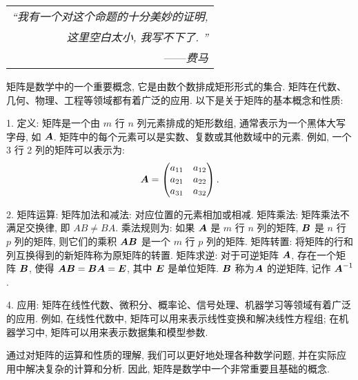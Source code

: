 \begin{flushright}
    \begin{tabular}{r||}
        \textit{“我有一个对这个命题的十分美妙的证明, }\\
        \textit{这里空白太小, 我写不下了. ”}\\
        ——\textit{费马}
    \end{tabular}
\end{flushright}

矩阵是数学中的一个重要概念, 它是由数个数排成矩形形式的集合. 矩阵在代数、几何、物理、工程等领域都有着广泛的应用. 以下是关于矩阵的基本概念和性质: 

1. 定义: 矩阵是一个由 $m$ 行 $n$ 列元素排成的矩形数组, 通常表示为一个黑体大写字母, 如 $\vb*{A}$. 矩阵中的每个元素可以是实数、复数或其他数域中的元素. 例如, 一个 3 行 2 列的矩阵可以表示为: 
   $$\vb*{A} = \begin{pmatrix} a_{11} & a_{12} \\ a_{21} & a_{22} \\ a_{31} & a_{32} \end{pmatrix}.$$

2. 矩阵运算: 
   矩阵加法和减法: 对应位置的元素相加或相减. 
   矩阵乘法: 矩阵乘法不满足交换律, 即 $AB \neq BA$. 乘法规则为: 如果 $\vb*{A}$ 是 $m$ 行 $n$ 列的矩阵, $\vb*{B}$ 是 $n$ 行 $p$ 列的矩阵, 则它们的乘积 $\vb*{A B}$ 是一个 $m$ 行 $p$ 列的矩阵. 
   矩阵转置: 将矩阵的行和列互换得到的新矩阵称为原矩阵的转置. 
   矩阵求逆: 对于可逆矩阵 $\vb*{A}$, 存在一个矩阵 $\vb*{B}$, 使得 $\vb*{AB}=\vb*{BA}=\vb*{E}$, 其中 $\vb*{E}$ 是单位矩阵. $\vb*{B}$ 称为$\vb*{A}$ 的逆矩阵, 记作 $\vb*{A}^{-1}$. 

4. 应用: 矩阵在线性代数、微积分、概率论、信号处理、机器学习等领域有着广泛的应用. 例如, 在线性代数中, 矩阵可以用来表示线性变换和解决线性方程组; 在机器学习中, 矩阵可以用来表示数据集和模型参数. 

通过对矩阵的运算和性质的理解, 我们可以更好地处理各种数学问题, 并在实际应用中解决复杂的计算和分析. 因此, 矩阵是数学中一个非常重要且基础的概念. 

